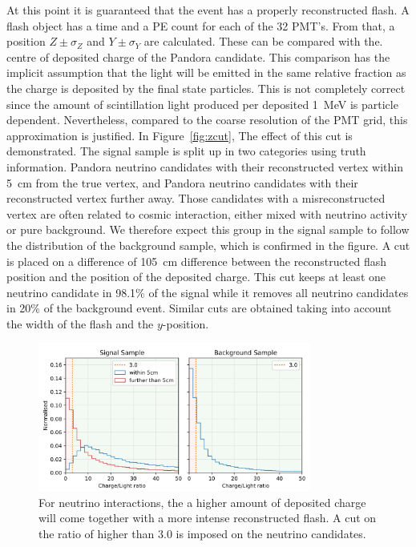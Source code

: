 \documentclass[a4paper]{article}
\begin{document}
At this point it is guaranteed that the event has a properly reconstructed flash. A flash object has a time and a PE count for each of the 32 PMT's. From that, a position $Z\pm \sigma_Z$ and $Y\pm \sigma_Y$ are calculated. These can be compared with the. centre of deposited charge of the Pandora candidate. This comparison has the implicit assumption that the light will be emitted in the same relative fraction as the charge is deposited by the final state particles. This is not completely correct since the amount of scintillation light produced per deposited \SI{1}{\MeV} is particle dependent. Nevertheless, compared to the coarse resolution of the PMT grid, this approximation is justified. In Figure~\ref{fig:zcut}, The effect of this cut is demonstrated. The signal sample is split up in two categories using truth information. Pandora neutrino candidates with their reconstructed vertex within \SI{5}{\cm} from the true vertex, and Pandora neutrino candidates with their reconstructed vertex further away. Those candidates with a misreconstructed vertex are often related to cosmic interaction, either mixed with neutrino activity or pure background. We therefore expect this group in the signal sample to follow the distribution of the background sample, which is confirmed in the figure. A cut is placed on a difference of \SI{105}{\cm} difference between the reconstructed flash position and the position of the deposited charge. This cut keeps at least one neutrino candidate in 98.1\% of the signal while it removes all neutrino candidates in 20\% of the background event. 
Similar cuts are obtained taking into account the width of the flash and the $y$-position. 

\begin{figure}[!htbp]
\centering
\includegraphics[width=0.8\textwidth]{charge}
\caption{For neutrino interactions, the a higher amount of deposited charge will come together with a more intense reconstructed flash. A cut on the ratio of higher than 3.0 is imposed on the neutrino candidates.} 
\label{fig:charge}
\end{figure}
\end{document}
